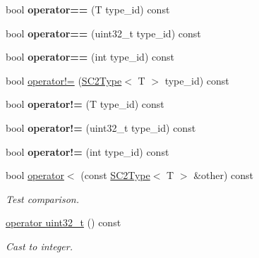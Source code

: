 \begin{DoxyCompactItemize}
bool {\bfseries operator==} (T type\+\_\+id) const
\item 
\mbox{\label{classsc2_1_1_s_c2_type_a4dcadbfd52b9acde5f49b2d452ac08fa}} 
bool {\bfseries operator==} (uint32\+\_\+t type\+\_\+id) const
\item 
\mbox{\label{classsc2_1_1_s_c2_type_ade586b36531920f32527128774df00b7}} 
bool {\bfseries operator==} (int type\+\_\+id) const
\item 
bool \hyperlink{classsc2_1_1_s_c2_type_a6e032550a699843364b52d9f30d7ddcc}{operator!=} (\hyperlink{classsc2_1_1_s_c2_type}{S\+C2\+Type}$<$ T $>$ type\+\_\+id) const
\item 
\mbox{\label{classsc2_1_1_s_c2_type_af18f2a54f07829ae2cc8501301f1764f}} 
bool {\bfseries operator!=} (T type\+\_\+id) const
\item 
\mbox{\label{classsc2_1_1_s_c2_type_afa64fdd5adf5eca49d3a95826e884fa1}} 
bool {\bfseries operator!=} (uint32\+\_\+t type\+\_\+id) const
\item 
\mbox{\label{classsc2_1_1_s_c2_type_a8195d6f42d7e7c193bf08dbd146ef22c}} 
bool {\bfseries operator!=} (int type\+\_\+id) const
\item 
\mbox{\label{classsc2_1_1_s_c2_type_a9ad0dc8b2a47eca60fa3a49c9c2e5de0}} 
bool \hyperlink{classsc2_1_1_s_c2_type_a9ad0dc8b2a47eca60fa3a49c9c2e5de0}{operator$<$} (const \hyperlink{classsc2_1_1_s_c2_type}{S\+C2\+Type}$<$ T $>$ \&other) const
\begin{DoxyCompactList}\small\item\em Test comparison. \end{DoxyCompactList}\item 
\mbox{\label{classsc2_1_1_s_c2_type_ab75e39605288070327604d10a5f720bf}} 
\hyperlink{classsc2_1_1_s_c2_type_ab75e39605288070327604d10a5f720bf}{operator uint32\+\_\+t} () const
\begin{DoxyCompactList}\small\item\em Cast to integer. \end{DoxyCompactList}\item 
\mbox{\label{classsc2_1_1_s_c2_type_a16ef14791e484bcb2708d262fbfbc46f}} 

\end{DoxyCompactItemize}
